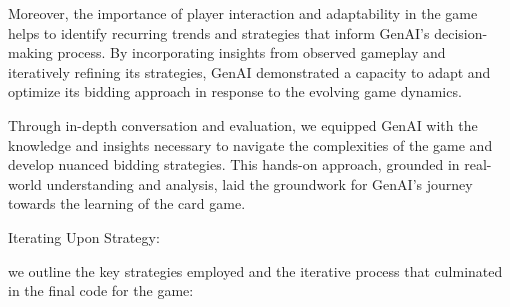 \documentclass[
]{article}
\begin{document}
Moreover, the importance of player interaction and adaptability in the
game helps to identify recurring trends and strategies that inform
GenAI's decision-making process. By incorporating insights from observed
gameplay and iteratively refining its strategies, GenAI demonstrated a
capacity to adapt and optimize its bidding approach in response to the
evolving game dynamics.

Through in-depth conversation and evaluation, we equipped GenAI with the
knowledge and insights necessary to navigate the complexities of the
game and develop nuanced bidding strategies. This hands-on approach,
grounded in real-world understanding and analysis, laid the groundwork
for GenAI's journey towards the learning of the card game.

Iterating Upon Strategy:

we outline the key strategies employed and the iterative process that
culminated in the final code for the game:
\end{document}
